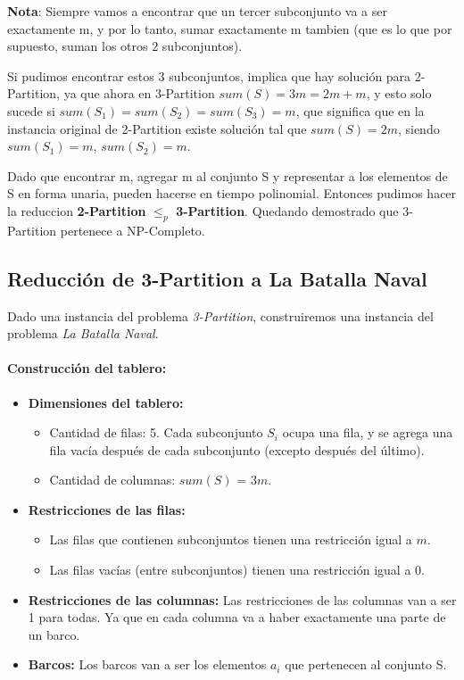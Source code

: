 \textbf{Nota}: Siempre vamos a encontrar que un tercer subconjunto va a ser exactamente m, y por lo tanto, sumar exactamente m tambien (que es lo que por supuesto, suman los otros 2 subconjuntos).

Si pudimos encontrar estos 3 subconjuntos, implica que hay solución para 2-Partition, ya que ahora en 3-Partition $sum(S) = 3m = 2m + m$, y esto solo sucede si $sum(S_1) = sum(S_2) = sum(S_3) = m$, que significa que en la instancia original de 2-Partition existe solución tal que $sum(S) = 2m$, siendo $sum(S_1) = m$, $sum(S_2) = m$.

Dado que encontrar m, agregar m al conjunto S y representar a los elementos de S en forma unaria, pueden hacerse en tiempo polinomial. Entonces pudimos hacer la reduccion \textbf{2-Partition} $\leq_p$ \textbf{3-Partition}. Quedando demostrado que 3-Partition pertenece a NP-Completo.

\subsection*{Reducción de 3-Partition a La Batalla Naval}

Dado una instancia del problema \textit{3-Partition}, construiremos una instancia del problema \textit{La Batalla Naval}.

\paragraph{Construcción del tablero:}

\begin{itemize}
    \item \textbf{Dimensiones del tablero:}
    \begin{itemize}
        \item Cantidad de filas: 5. Cada subconjunto \(S_i\) ocupa una fila, y se agrega una fila vacía después de cada subconjunto (excepto después del último).
        \item Cantidad de columnas: $sum(S)$ = \(3m\).
    \end{itemize}

    \item \textbf{Restricciones de las filas:}
    \begin{itemize}
        \item Las filas que contienen subconjuntos tienen una restricción igual a $m$.
        \item Las filas vacías (entre subconjuntos) tienen una restricción igual a 0.
    \end{itemize}

    \item \textbf{Restricciones de las columnas:} Las restricciones de las columnas van a ser 1 para todas. Ya que en cada columna va a haber exactamente una parte de un barco.

    \item \textbf{Barcos:} Los barcos van a ser los elementos $a_i$ que pertenecen al conjunto S.
\end{itemize}

